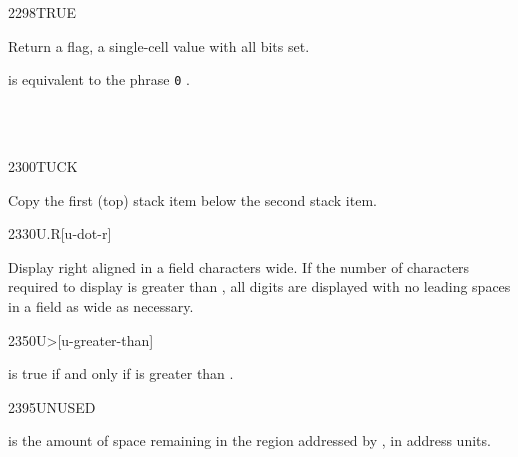 \vspace*{-1ex}
\begin{worddef}{2298}{TRUE}
\item {}

	Return a  flag, a single-cell value with all
	bits set.


	\begin{rationale} %
		 is equivalent to the phrase
		\texttt{0} .
	\end{rationale}

	\begin{testing}
	 \\
	 \\
	\end{testing}
\end{worddef}

\vspace*{-1ex}
\begin{worddef}{2300}{TUCK}
\item {}

	Copy the first (top) stack item below the second stack item.
\end{worddef}

\vspace*{-1ex}
\begin{worddef}{2330}{U.R}[u-dot-r]
\item {}

	Display  right aligned in a field  characters
	wide. If the number of characters required to display 
	is greater than , all digits are displayed with no leading
	spaces in a field as wide as necessary.
\end{worddef}

\vspace*{-1ex}
\begin{worddef}[Umore]{2350}{U>}[u-greater-than]
\item {}

	 is true if and only if  is greater than
	.

\end{worddef}


\begin{worddef}{2395}{UNUSED}
\item {}

	 is the amount of space remaining in the region addressed
	by , in address units.
\end{worddef}


